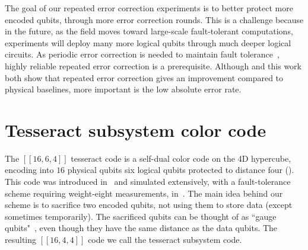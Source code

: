 \documentclass[10pt, twocolumn, aps, nofootinbib, longbibliography, nobibnotes, superscriptaddress]{revtex4-1} %
\begin{document}
\smallskip
The goal of our repeated error correction experiments is to better protect more encoded qubits, through more error correction rounds.  This is a challenge because in the future, as the field moves toward large-scale fault-tolerant computations, experiments will deploy many more logical qubits through much deeper logical circuits.  As periodic error correction is needed to maintain fault tolerance~\cite{AharonovBenOr99, KnillLaflammeZurekScience98, AliferisGottesmanPreskill05}, highly reliable repeated error correction is a prerequisite.  %
Although \cite{Silva24microsoft12qubitcode} and this work both show that repeated error correction gives an improvement compared to physical baselines, more important is the low absolute error rate.  


\section{Tesseract subsystem color code} \label{s:tesseractcode}

The $[[16,6,4]]$ tesseract code is a self-dual color code on the 4D hypercube, encoding into $16$ physical qubits six logical qubits protected to distance four 
().  This code was introduced in~\cite{delfosse2020short} and simulated extensively, with a fault-tolerance scheme requiring weight-eight measurements, in~\cite{PrabhuReichardt24code16}.  
The main idea behind our scheme is to sacrifice two encoded qubits, not using them to store data (except sometimes temporarily).  
The sacrificed qubits can be thought of as ``gauge qubits"~\cite{Bacon05operator}, even though they have the same distance as the data qubits.  
The resulting $[[16,4,4]]$ code we call the tesseract subsystem code.  

\end{document}
